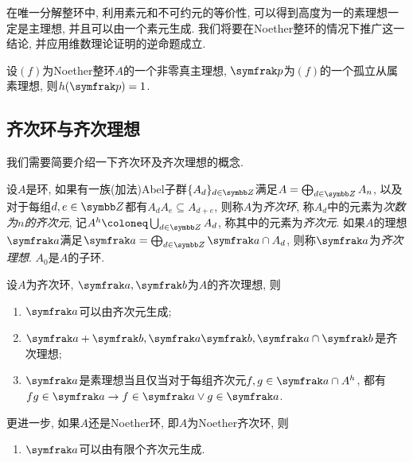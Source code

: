 
在唯一分解整环中, 利用素元和不可约元的等价性, 可以得到高度为一的素理想一定是主理想, 并且可以由一个素元生成\parencite[174, Exercise 21.32]{altman_term_2017}. 我们将要在Noether整环的情况下推广这一结论, 并应用维数理论证明的逆命题成立.

\begin{theorem}\label{thm:krullhauptidealsatz}
  设$(f)$为Noether整环$A$的一个非零真主理想, $\ideal{p}$为$(f)$的一个孤立从属素理想, 则$h(\ideal{p})=1$.
\end{theorem}


\subsection{齐次环与齐次理想}

我们需要简要介绍一下齐次环及齐次理想的概念.

设$A$是环, 如果有一族(加法)Abel子群$\{A_d\}_{d\in \ZZ}$满足$A=\bigoplus_{d\in\ZZ}A_n$, 以及对于每组$d, e\in \ZZ$都有$A_dA_e\subseteq A_{d+e}$, 则称$A$为\emph{齐次环}, 称$A_d$中的元素为\emph{次数为$n$的齐次元}, 记$A^h\coloneq\bigcup_{d\in\ZZ}A_d$, 称其中的元素为\emph{齐次元}. 如果$A$的理想$\ideal{a}$满足$\ideal{a}=\bigoplus_{d\in \ZZ}\ideal{a}\cap A_d$, 则称$\ideal{a}$为\emph{齐次理想}. $A_0$是$A$的子环.

\begin{proposition}
  设$A$为齐次环, $\ideal{a}, \ideal{b}$为$A$的齐次理想, 则
  \begin{enumerate}
    \item $\ideal{a}$可以由齐次元生成;
    \item $\ideal{a}+\ideal{b}, \ideal{a}\ideal{b}, \ideal{a}\cap\ideal{b}$是齐次理想;
    \item $\ideal{a}$是素理想当且仅当对于每组齐次元$f, g\in\ideal{a}\cap A^h$, 都有$fg\in \ideal{a}\rightarrow f\in\ideal{a}\vee g\in\ideal{a}$.
  \end{enumerate}
  更进一步, 如果$A$还是Noether环, 即$A$为Noether齐次环, 则
  \begin{enumerate}[resume*]
    \item $\ideal{a}$可以由有限个齐次元生成.
  \end{enumerate}
\end{proposition}

